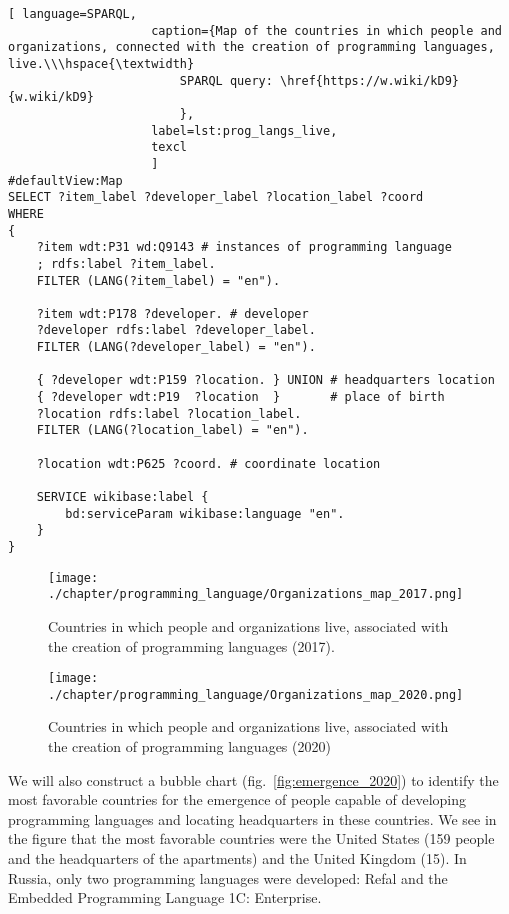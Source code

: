 \begin{lstlisting}[ language=SPARQL, 
                    caption={Map of the countries in which people and organizations, connected with the creation of programming languages, live.\\\hspace{\textwidth}
                        SPARQL query: \href{https://w.wiki/kD9}{w.wiki/kD9}
                        },
                    label=lst:prog_langs_live,
                    texcl 
                    ]
#defaultView:Map
SELECT ?item_label ?developer_label ?location_label ?coord
WHERE
{
    ?item wdt:P31 wd:Q9143 # instances of programming language
    ; rdfs:label ?item_label.     
    FILTER (LANG(?item_label) = "en"). 
  
    ?item wdt:P178 ?developer. # developer
    ?developer rdfs:label ?developer_label. 
    FILTER (LANG(?developer_label) = "en"). 
      		
    { ?developer wdt:P159 ?location. } UNION # headquarters location
    { ?developer wdt:P19  ?location  }       # place of birth
    ?location rdfs:label ?location_label. 
    FILTER (LANG(?location_label) = "en").
    
    ?location wdt:P625 ?coord. # coordinate location

    SERVICE wikibase:label {
        bd:serviceParam wikibase:language "en".
    }   	
}
\end{lstlisting}%

\begin{figure}[h]
\centering
	\texttt{[image: ./chapter/programming\_language/Organizations\_map\_2017.png]}
	\caption{Countries in which people and organizations live, associated with the creation of programming languages (2017).}
	\label{fig:organizations_2017}
\end{figure}

\begin{figure}[h]
\centering
	\texttt{[image: ./chapter/programming\_language/Organizations\_map\_2020.png]}
	\caption{Countries in which people and organizations live, associated with the creation of programming languages (2020)}
	\label{fig:organizations_2020}
\end{figure}

We will also construct a bubble chart (fig.~\ref{fig:emergence_2020}) to identify the most favorable countries for the emergence of people capable of developing programming languages and locating headquarters in these countries. We see in the figure that the most favorable countries were the United States (159 people and the headquarters of the apartments) and the United Kingdom (15). In Russia, only two programming languages were developed: Refal and the Embedded Programming Language 1C: Enterprise.

